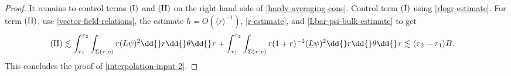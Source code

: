 \documentclass[10pt, reqno]{amsart}
\begin{document}
\begin{proof}
It remains to control terms \(\textnormal{(I)}\) and \(\textnormal{(II)}\) on
the right-hand side of \cref{hardy-averaging-cons}. Control term \(\textnormal{(I)}\)
using \cref{rlogr-estimate}. For term \(\textnormal{(II)}\), use
\cref{vector-field-relations}, the estimate \(h = O(\langle{}r\rangle^{-1})\),
\cref{r-estimate}, and \cref{Lbar-psi-bulk-estimate} to get
\begin{equation}\label{interpolation-input-2-prep}
\begin{split}
\textnormal{(II)} &\lesssim \int_{\tau{}_1}^{\tau{}_2}\int _{\Sigma{}(\tau{},v)} r(L\psi{})^2\dd{}r\dd{}\theta{}\dd{}\tau{} + \int_{\tau{}_1}^{\tau{}_2}\int _{\Sigma{}(\tau{},v)}r(1+r)^{-2}(\underline{L}\psi{})^2\dd{}r\dd{}\theta{}\dd{}\tau{} \lesssim \langle{}\tau{}_2-\tau{}_1\rangle{}B.
\end{split}
\end{equation}
This concludes the proof of \cref{interpolation-input-2}.
\end{proof}
\hypersetup{urlcolor=Black}
\printbibliography
\end{document}
